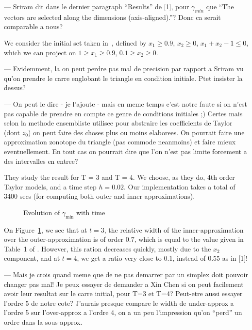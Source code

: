 \documentclass{sig-alternate-05-2015} %
\newcommand\ForAuthors[1]%
 {\par\smallskip                     %
  \begin{center}%
   \fbox%
   {\parbox{0.9\linewidth}%
    {\raggedright\sc--- #1}%
   }%
  \end{center}%
  \par\smallskip                     %
 }
\begin{document}
\ForAuthors{Sriram dit dans le dernier paragraph ``Results'' de [1], 
pour $\gamma_{min}$ que ``The vectors are selected along the dimensions
(axis-aligned).''? Donc ca serait comparable a nous?}

We consider the initial set taken in~\cite{Underapproxflowpipes}, defined by 
$x_1 \geq 0.9$, $x_2 \geq 0$, $x_1+x_2-1 \leq 0$, which we can project on $1 \geq x_1 \geq 0.9$, $0.1 \geq x_2 \geq 0$.
\ForAuthors{Evidemment, la on peut perdre pas mal de precision par rapport
a Sriram vu qu'on prendre le carre englobant le triangle en condition initiale. Ptet insister la dessus?}
\ForAuthors{On peut le dire - je l'ajoute - mais en meme temps c'est notre faute si on n'est pas capable 
de prendre en compte ce genre de conditions initiales ;) Certes mais selon
la methode ensembliste utilisee pour abstraire les coefficients de Taylor
(dont $z_0$) on peut faire des choses plus ou moins elaborees. On pourrait
faire une approximation zonotope du triangle (pas commode neanmoins) et
faire mieux eventuellement. En tout cas on pourrait dire que l'on n'est pas
limite forcement a des intervalles en entree?}
They study the result for T = 3 and T = 4. We choose, as they do, 4th order Taylor models, and a time step $h=0.02$. 
Our implementation takes a total of 3400 secs (for computing both outer and inner approximations).

\begin{center}
\end{center}
\begin{center}
\end{center}
\begin{center}
\end{center}
\begin{center}
\end{center}
\begin{figure}
\begin{center}
\end{center}
\caption{Evolution of $\gamma_{\min}$ with time}
\label{ex:width_sriram_bruss}
\end{figure}
On Figure~\ref{ex:width_sriram_bruss}, we see that at $t=3$, the relative width of the inner-approximation over the
outer-approximation is of order $0.7$, which is equal to the value given in Table~1 of \cite{Underapproxflowpipes}. 
However, this ration decreases quickly, mostly due to the $x_2$ component, and at $t=4$, we get a ratio very close to $0.1$,
instead of 0.55 as in [1]!
\ForAuthors{Mais je crois quand meme que de ne
pas demarrer par un simplex doit pouvoir changer pas mal! Je peux essayer
de demander a Xin Chen si on peut facilement avoir leur resultat sur le
carre initial, pour T=3 et T=4? Peut-etre aussi essayer l'ordre 5 de notre
cote? J'aurais presque compare le width de under-approx a l'ordre 5 sur
l'over-approx a l'ordre 4, on a un peu l'impression qu'on ``perd'' un ordre
dans la sous-approx.}
\end{document}
